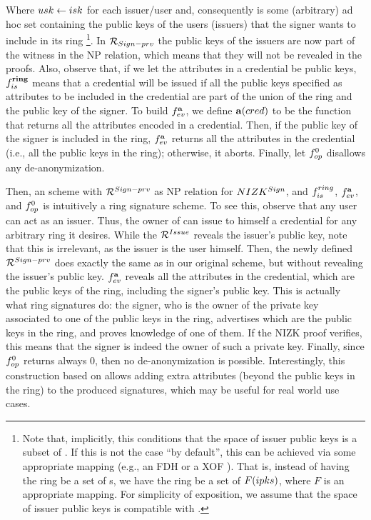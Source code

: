 Where $usk \gets isk$ for each issuer/user and, consequently 
\sring is some (arbitrary) ad hoc set containing the public keys of the
users (issuers) that the signer wants to include in its ring%
\footnote{Note that, implicitly, this conditions that the space of issuer public
  keys is a subset of \AttrSpace. If this is not the case ``by default'', this
  can be achieved via some appropriate mapping (e.g., an FDH or a XOF
  \needcite). That is, instead of having the ring be a set of {\ipk}s, we
  have the ring be a set of $F({ipk}s)$, where $F$ is an appropriate mapping.
  For simplicity of exposition, we assume that the space of issuer public keys
  is compatible with \AttrSpace.}.
In $\mathcal{R}_{Sign-prv}$
the public keys of the issuers are now part of the witness in the NP relation,
which means that they will not be revealed in the proofs. Also, observe that, if
we let the attributes in a credential be public keys, $f_{is}^{\mathbf{ring}}$ means
that a credential will be issued if all the public keys specified as attributes
to be included in the credential are part of the union of the ring and the
public key of the signer. To build $f_{ev}^{\mathbf{a}}$, we define $\mathbf{a}(cred)$
to be the function that returns all the attributes encoded in a credential.
Then, if the public key of the signer is included in the ring, $f_{ev}^{\mathbf{a}}$
returns all the attributes in the credential (i.e., all the public keys in the
ring); otherwise, it aborts. Finally, let $f_{op}^0$ disallows any
de-anonymization.

Then, an \UAS scheme with $\mathcal{R}^{Sign-prv}$ as NP relation for
$NIZK^{Sign}$, and $f_{is}^{ring}$, $f_{ev}^{\mathbf{a}}$, and $f_{op}^0$ is
intuitively a ring signature scheme. To see this, observe that any user can
act as an issuer. Thus, the owner of \usk can issue to himself a credential
for any arbitrary ring it desires. While the $\mathcal{R}^{Issue}$ reveals the
issuer's public key, note that this is irrelevant, as the issuer is the user
himself. Then, the newly defined $\mathcal{R}^{Sign-prv}$ does exactly the same
as in our original \UAS scheme, but without revealing the issuer's public key.
$f_{ev}^{\mathbf{a}}$ reveals all the attributes in the credential, which are
the public keys of the ring, including the signer's public key. This is actually
what ring signatures do: the signer, who is the owner of the private key
associated to one of the public keys in the ring, advertises which are the
public keys in the ring, and proves knowledge of one of them. If the NIZK
proof verifies, this means that the signer is indeed the owner of such a private
key. Finally, since $f_{op}^0$ returns always $0$, then no de-anonymization is
possible.
%
Interestingly, this construction based on \UAS allows adding extra attributes
(beyond the public keys in the ring) to the produced signatures, which may be
useful for real world use cases.

